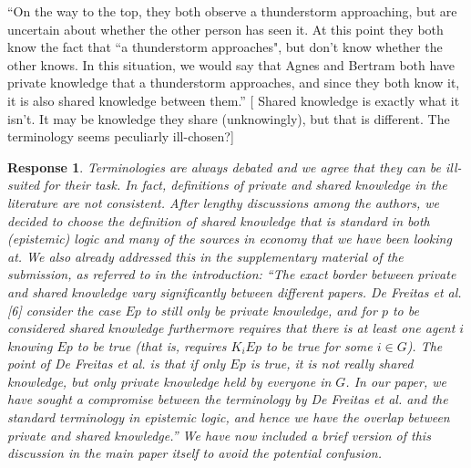 \documentclass[a4paper]{article}
\newtheorem{response}{Response}
\begin{document}
``On the way to the top, they both observe a thunderstorm approaching, but are uncertain about whether the other person has seen it. At this point they both know the fact that ``a thunderstorm approaches", but don't know whether the other knows. In this situation, we would say that Agnes and Bertram both have private knowledge that a thunderstorm approaches, and since they both know it, it is also shared knowledge between them.''
[ Shared knowledge is exactly what it isn't. It may be knowledge they share (unknowingly), but that is different. The terminology seems peculiarly ill-chosen?]

\begin{response}
Terminologies are always debated and we agree that they can be ill-suited for their task. In fact, definitions of private and shared knowledge in the literature are not consistent. After lengthy discussions among the authors, we decided to choose the definition of shared knowledge that is standard in both (epistemic) logic and many of the sources in economy that we have been looking at. We also already addressed this in the supplementary material of the submission, as referred to in the introduction:  ``The exact border between private and shared knowledge vary significantly between different papers. De Freitas et al. [6] consider the case $Ep$ to still only be private knowledge, and for $p$ to be considered shared knowledge furthermore requires that there is at least one agent $i$ knowing $Ep$ to be true (that is, requires $K_i Ep$ to be true for some $i \in G$). The point of De Freitas et al. is that if only $Ep$ is true, it is not really shared knowledge, but only private knowledge held by everyone in $G$. In our paper, we have sought a compromise between the terminology by De Freitas et al. and the standard terminology in epistemic logic, and hence we have the overlap between private and shared knowledge.'' We have now included a brief version of this discussion in the main paper itself to avoid the potential confusion. 
\end{response}
\end{document}
